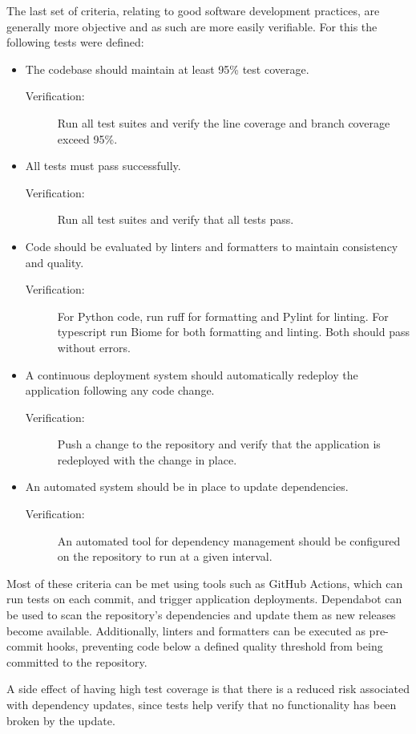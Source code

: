 The last set of criteria, relating to good software development practices, are generally more objective and as such are more easily verifiable. For this the following tests were defined:
\begin{itemize}
    \item The codebase should maintain at least 95\% test coverage.
    \begin{description}
        \item[Verification:] Run all test suites and verify the line coverage and branch coverage exceed 95\%.
    \end{description}
    \item All tests must pass successfully.
    \begin{description}
        \item[Verification:] Run all test suites and verify that all tests pass.
    \end{description}
    \item Code should be evaluated by linters and formatters to maintain consistency and quality.
    \begin{description}
        \item[Verification:] For Python code, run ruff for formatting and Pylint for linting. For typescript run Biome for both formatting and linting. Both should pass without errors.
    \end{description}
    \item A continuous deployment system should automatically redeploy the application following any code change.
    \begin{description}
        \item[Verification:] Push a change to the repository and verify that the application is redeployed with the change in place.
    \end{description}
    \item An automated system should be in place to update dependencies.
    \begin{description}
        \item[Verification:] An automated tool for dependency management should be configured on the repository to run at a given interval.
    \end{description}
\end{itemize}

Most of these criteria can be met using tools such as GitHub Actions, which can run tests on each commit, and trigger application deployments. Dependabot can be used to scan the repository’s dependencies and update them as new releases become available. Additionally, linters and formatters can be executed as pre-commit hooks, preventing code below a defined quality threshold from being committed to the repository.

A side effect of having high test coverage is that there is a reduced risk associated with dependency updates, since tests help verify that no functionality has been broken by the update.
